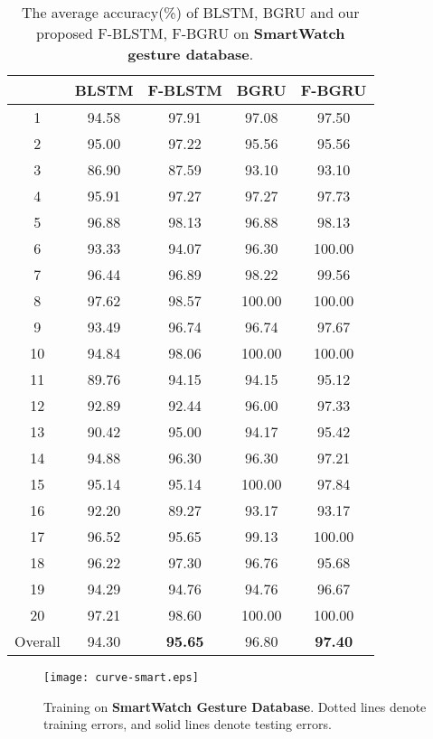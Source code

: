 \documentclass[review]{elsarticle}
\begin{document}
\begin{table*}
	\centering
	\caption{The average accuracy(\%) of BLSTM, BGRU and our proposed F-BLSTM, F-BGRU on \textbf{SmartWatch gesture database}.}
	\label{table:smartwatch-database}
	\vspace*{6pt}
	\begin{tabular}{||c||c|c||c|c||}
		\hline
		\diagbox{\textbf{Gesture}}{\textbf{Method}} & BLSTM & F-BLSTM & BGRU & F-BGRU\\
		\hline
		1  & 94.58  & 97.91 & 97.08  & 97.50 \\ %
		2  & 95.00  & 97.22 & 95.56  & 95.56 \\ %
		3  & 86.90  & 87.59 & 93.10  & 93.10 \\ %
		4  & 95.91  & 97.27 & 97.27  & 97.73 \\ %
		5  & 96.88  & 98.13 & 96.88  & 98.13 \\ %
		6  & 93.33  & 94.07 & 96.30  & 100.00 \\ %
		7  & 96.44  & 96.89 & 98.22  & 99.56 \\ %
		8  & 97.62  & 98.57 & 100.00  & 100.00 \\ %
		9  & 93.49  & 96.74 & 96.74  & 97.67 \\ %
		10 & 94.84  & 98.06 & 100.00  & 100.00 \\ %
		11 & 89.76  & 94.15 & 94.15  & 95.12 \\ %
		12 & 92.89  & 92.44 & 96.00  & 97.33 \\ %
		13 & 90.42  & 95.00 & 94.17  & 95.42 \\ %
		14 & 94.88  & 96.30 & 96.30  & 97.21 \\ %
		15 & 95.14  & 95.14 & 100.00  & 97.84 \\ %
		16 & 92.20  & 89.27 & 93.17  & 93.17 \\ %
		17 & 96.52  & 95.65 & 99.13  & 100.00 \\ %
		18 & 96.22  & 97.30 & 96.76  & 95.68 \\ %
		19 & 94.29  & 94.76 & 94.76  & 96.67 \\ %
		20 & 97.21  & 98.60 & 100.00  & 100.00 \\ \hline
		Overall & 94.30 & \textbf{95.65} & 96.80 & \textbf{97.40} \\ \hline
	\end{tabular}
\end{table*}

\begin{figure*}[htbp]
	\normalsize
	\centering
	\texttt{[image: curve-smart.eps]}
	\caption{Training on \textbf{SmartWatch Gesture Database}. Dotted lines denote training errors, and solid lines denote testing errors. }
	\label{fig:curve-smart}
	\vspace*{4pt}
\end{figure*}
\end{document}
